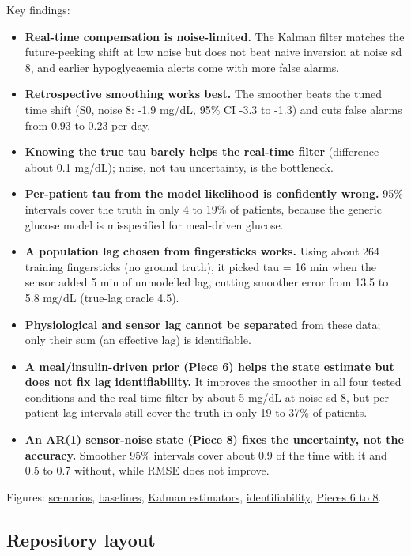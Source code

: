 \documentclass[11pt,a4paper]{article}
\providecommand{\tightlist}{\setlength{\itemsep}{0pt}\setlength{\parskip}{0pt}}
\begin{document}
Key findings:

\begin{itemize}
\tightlist
\item
  \textbf{Real-time compensation is noise-limited.} The Kalman filter
  matches the future-peeking shift at low noise but does not beat naive
  inversion at noise sd 8, and earlier hypoglycaemia alerts come with
  more false alarms.
\item
  \textbf{Retrospective smoothing works best.} The smoother beats the
  tuned time shift (S0, noise 8: -1.9 mg/dL, 95\% CI -3.3 to -1.3) and
  cuts false alarms from 0.93 to 0.23 per day.
\item
  \textbf{Knowing the true tau barely helps the real-time filter}
  (difference about 0.1 mg/dL); noise, not tau uncertainty, is the
  bottleneck.
\item
  \textbf{Per-patient tau from the model likelihood is confidently
  wrong.} 95\% intervals cover the truth in only 4 to 19\% of patients,
  because the generic glucose model is misspecified for meal-driven
  glucose.
\item
  \textbf{A population lag chosen from fingersticks works.} Using about
  264 training fingersticks (no ground truth), it picked tau = 16 min
  when the sensor added 5 min of unmodelled lag, cutting smoother error
  from 13.5 to 5.8 mg/dL (true-lag oracle 4.5).
\item
  \textbf{Physiological and sensor lag cannot be separated} from these
  data; only their sum (an effective lag) is identifiable.
\item
  \textbf{A meal/insulin-driven prior (Piece 6) helps the state estimate
  but does not fix lag identifiability.} It improves the smoother in all
  four tested conditions and the real-time filter by about 5 mg/dL at
  noise sd 8, but per-patient lag intervals still cover the truth in
  only 19 to 37\% of patients.
\item
  \textbf{An AR(1) sensor-noise state (Piece 8) fixes the uncertainty,
  not the accuracy.} Smoother 95\% intervals cover about 0.9 of the time
  with it and 0.5 to 0.7 without, while RMSE does not improve.
\end{itemize}

Figures: \href{results/fig_scenarios.png}{scenarios},
\href{results/fig_baselines.png}{baselines},
\href{results/fig_kalman.png}{Kalman estimators},
\href{results/fig_ident.png}{identifiability},
\href{results/fig_pieces678.png}{Pieces 6 to 8}.

\hypertarget{repository-layout}{%
\subsection{Repository layout}\label{repository-layout}}
\end{document}
